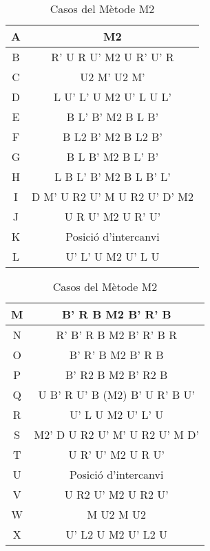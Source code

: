 \begin{table}[h]
    \begin{minipage}{.5\linewidth}
        \centering
        \begin{tabular}{|c|c|}
            \hline
            A & M2 \\
            \hline
            B & R' U R U' M2 U R' U' R \\
            \hline
            C & U2 M' U2 M' \\
            \hline
            D & L U' L' U M2 U' L U L'  \\
            \hline
            E & B L' B' M2 B L B'  \\
            \hline
            F & B L2 B' M2 B L2 B' \\
            \hline
            G & B L B' M2 B L' B' \\
            \hline
            H & L B L' B' M2 B L B' L' \\
            \hline
            I & D M' U R2 U' M U R2 U' D' M2 \\
            \hline
            J & U R U' M2 U R' U' \\
            \hline
            K & Posició d'intercanvi \\
            \hline
            L & U' L' U M2 U' L U \\
            \hline 
        \end{tabular}
    \end{minipage}
    \begin{minipage}{.5\linewidth}
        \centering
        \begin{tabular}{|c|c|}
            \hline
             M & B' R B M2 B' R' B \\
             \hline
             N & R' B' R B M2 B' R' B R  \\
             \hline
             O & B' R' B M2 B' R B \\
             \hline
             P & B' R2 B M2 B' R2 B \\
             \hline
             Q & U B' R U' B (M2) B' U R' B U' \\
             \hline
             R & U' L U M2 U' L' U \\
             \hline
             S & M2' D U R2 U' M' U R2 U' M D' \\
             \hline
             T & U R' U' M2 U R U'  \\
             \hline
             U & Posició d'intercanvi \\
             \hline
             V & U R2 U' M2 U R2 U' \\
             \hline
             W & M U2 M U2  \\
             \hline
             X & U' L2 U M2 U' L2 U \\
             \hline 
        \end{tabular}
    \end{minipage} 
    \caption{Casos del Mètode M2}
    \label{fig:taula-m22}
\end{table}


